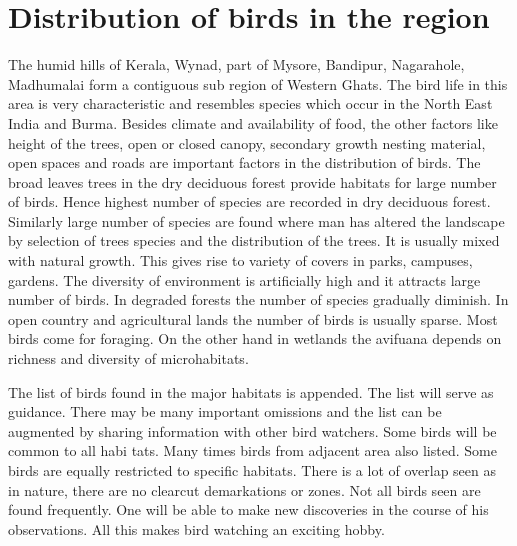 \chapter{Distribution of birds in the region}%

The humid hills of Kerala, Wynad, part of Mysore, Bandipur, 
Nagarahole, Madhumalai form a contiguous sub region of Western 
Ghats. The bird life in this area is very characteristic and 
resembles species which occur in the North East India and Burma. 
Besides climate and availability of food, the other factors like 
height of the trees, open or closed canopy, secondary growth 
nesting material, open spaces and roads are important factors in 
the distribution of birds. The broad leaves trees in the dry 
deciduous forest provide habitats for large number of birds. 
Hence highest number of species are recorded in dry deciduous 
forest. Similarly large number of species are found where man has 
altered the landscape by selection of trees species and the 
distribution of the trees. It is usually mixed with natural 
growth. This gives rise to variety of covers in parks, campuses, 
gardens. The diversity of environment is artificially high and it 
attracts large number of birds. In degraded forests the number of 
species gradually diminish. In open country and agricultural 
lands the number of birds is usually sparse. Most birds come for 
foraging. On the other hand in wetlands the avifuana depends on 
richness and diversity of microhabitats. 

The list of birds found in the major habitats is appended. 
The list will serve as guidance. There may be many important 
omissions and the list can be augmented by sharing information 
with other bird watchers. Some birds will be common to all habi
tats. Many times birds from adjacent area also listed. Some birds 
are equally restricted to specific habitats. There is a lot of 
overlap seen as in nature, there are no clearcut demarkations or 
zones. Not all birds seen are found frequently. One will be able 
to make new discoveries in the course of his observations. All 
this makes bird watching an exciting hobby. 

\newpage

~\phantom{a}
\vfill

\thispagestyle{empty}

\begin{figure}[H]
\end{figure}

